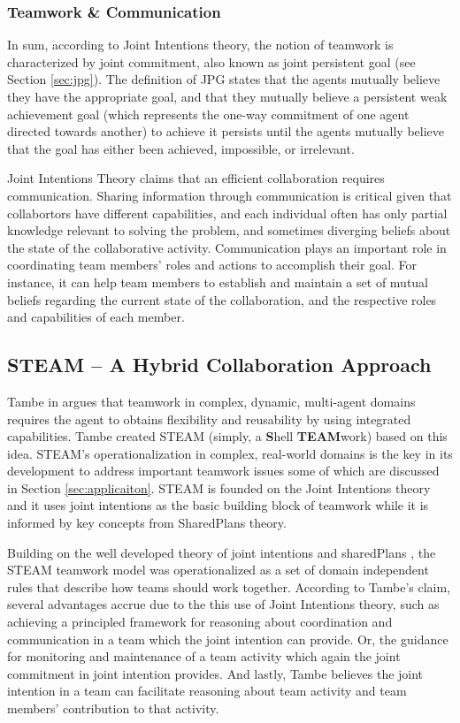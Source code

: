\documentclass[11pt]{article}
\begin{document}
\subsubsection{Teamwork \& Communication}

In sum, according to Joint Intentions theory, the notion of teamwork is
characterized by joint commitment, also known as joint persistent goal (see
Section \ref{sec:jpg}). The definition of JPG states that the agents mutually
believe they have the appropriate goal, and that they mutually believe a
persistent weak achievement goal (which represents the one-way commitment of one
agent directed towards another) to achieve it persists until the agents mutually
believe that the goal has either been achieved, impossible, or irrelevant.

Joint Intentions Theory claims that an efficient collaboration requires
communication. Sharing information through communication is critical given that
collabortors have different capabilities, and each individual often has only
partial knowledge relevant to solving the problem, and sometimes diverging
beliefs about the state of the collaborative activity. Communication plays an
important role in coordinating team members' roles and actions to accomplish
their goal. For instance, it can help team members to establish and maintain a
set of mutual beliefs regarding the current state of the collaboration, and the
respective roles and capabilities of each member.

\subsection{STEAM -- A Hybrid Collaboration Approach}

Tambe in \cite{tambe:flexible-teamwork} argues that teamwork in complex,
dynamic, multi-agent domains requires the agent to obtains flexibility and
reusability by using integrated capabilities. Tambe created STEAM (simply, a
\textbf{S}hell \textbf{TEAM}work) based on this idea. STEAM's operationalization
in complex, real-world domains is the key in its development to address
important teamwork issues some of which are discussed in Section
\ref{sec:applicaiton}. STEAM is founded on the Joint Intentions theory and it
uses joint intentions as the basic building block of teamwork while it is
informed by key concepts from SharedPlans theory.

Building on the well developed theory of joint intentions \cite{cohen:teamwork}
and sharedPlans \cite{grosz:collaboration, grosz:plans-discourse}, the STEAM
teamwork model \cite{tambe:flexible-teamwork} was operationalized as a set of
domain independent rules that describe how teams should work together. According
to Tambe's claim, several advantages accrue due to the this use of Joint
Intentions theory, such as achieving a principled framework for reasoning about
coordination and communication in a team which the joint intention can provide.
Or, the guidance for monitoring and maintenance of a team activity which again
the joint commitment in joint intention provides. And lastly, Tambe believes the
joint intention in a team can facilitate reasoning about team activity and team
members' contribution to that activity. 
\end{document}
